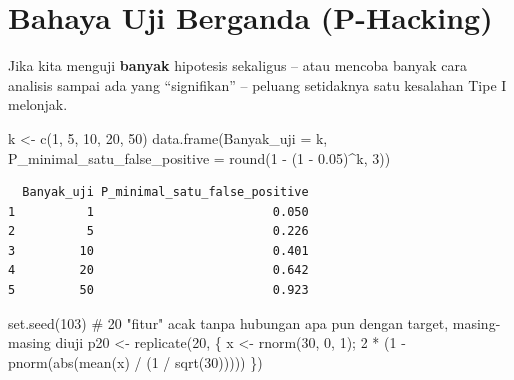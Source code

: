 \documentclass[
  indonesian,
  letterpaper,
]{book}
\newenvironment{Shaded}{\begin{snugshade}}{\end{snugshade}}
\newcommand{\AttributeTok}[1]{\textcolor[rgb]{0.40,0.45,0.13}{#1}}
\newcommand{\CommentTok}[1]{\textcolor[rgb]{0.37,0.37,0.37}{#1}}
\newcommand{\DecValTok}[1]{\textcolor[rgb]{0.68,0.00,0.00}{#1}}
\newcommand{\FloatTok}[1]{\textcolor[rgb]{0.68,0.00,0.00}{#1}}
\newcommand{\FunctionTok}[1]{\textcolor[rgb]{0.28,0.35,0.67}{#1}}
\newcommand{\NormalTok}[1]{\textcolor[rgb]{0.00,0.23,0.31}{#1}}
\newcommand{\OtherTok}[1]{\textcolor[rgb]{0.00,0.23,0.31}{#1}}
\newcommand{\SpecialCharTok}[1]{\textcolor[rgb]{0.37,0.37,0.37}{#1}}
\begin{document}
\section{Bahaya Uji Berganda
(P-Hacking)}\label{bahaya-uji-berganda-p-hacking}

Jika kita menguji \textbf{banyak} hipotesis sekaligus -- atau mencoba
banyak cara analisis sampai ada yang ``signifikan'' -- peluang
setidaknya satu kesalahan Tipe I melonjak.

\begin{Shaded}
\begin{Highlighting}[]
\NormalTok{k }\OtherTok{\textless{}{-}} \FunctionTok{c}\NormalTok{(}\DecValTok{1}\NormalTok{, }\DecValTok{5}\NormalTok{, }\DecValTok{10}\NormalTok{, }\DecValTok{20}\NormalTok{, }\DecValTok{50}\NormalTok{)}
\FunctionTok{data.frame}\NormalTok{(}\AttributeTok{Banyak\_uji =}\NormalTok{ k, }\AttributeTok{P\_minimal\_satu\_false\_positive =} \FunctionTok{round}\NormalTok{(}\DecValTok{1} \SpecialCharTok{{-}}\NormalTok{ (}\DecValTok{1} \SpecialCharTok{{-}} \FloatTok{0.05}\NormalTok{)}\SpecialCharTok{\^{}}\NormalTok{k, }\DecValTok{3}\NormalTok{))}
\end{Highlighting}
\end{Shaded}

\begin{verbatim}
  Banyak_uji P_minimal_satu_false_positive
1          1                         0.050
2          5                         0.226
3         10                         0.401
4         20                         0.642
5         50                         0.923
\end{verbatim}

\begin{Shaded}
\begin{Highlighting}[]
\FunctionTok{set.seed}\NormalTok{(}\DecValTok{103}\NormalTok{)}
\CommentTok{\# 20 "fitur" acak tanpa hubungan apa pun dengan target, masing{-}masing diuji}
\NormalTok{p20 }\OtherTok{\textless{}{-}} \FunctionTok{replicate}\NormalTok{(}\DecValTok{20}\NormalTok{, \{ x }\OtherTok{\textless{}{-}} \FunctionTok{rnorm}\NormalTok{(}\DecValTok{30}\NormalTok{, }\DecValTok{0}\NormalTok{, }\DecValTok{1}\NormalTok{); }\DecValTok{2} \SpecialCharTok{*}\NormalTok{ (}\DecValTok{1} \SpecialCharTok{{-}} \FunctionTok{pnorm}\NormalTok{(}\FunctionTok{abs}\NormalTok{(}\FunctionTok{mean}\NormalTok{(x) }\SpecialCharTok{/}\NormalTok{ (}\DecValTok{1} \SpecialCharTok{/} \FunctionTok{sqrt}\NormalTok{(}\DecValTok{30}\NormalTok{))))) \})}
\end{Highlighting}
\end{Shaded}
\end{document}
